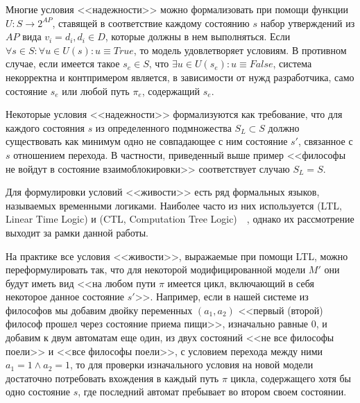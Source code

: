 Многие условия <<надежности>> можно формализовать при помощи функции $U\colon S
\rightarrow 2^{AP}$, ставящей в соответствие каждому состоянию $s$ набор утверждений из
$AP$ вида $v_i = d_i, d_i \in D$, которые должны в нем выполняться. Если $\forall s \in
S:\forall u \in U(s):u \equiv True$, то модель удовлетворяет условиям. В противном случае,
если имеется такое $s_e \in S$, что $\exists u \in U(s_e)\colon u \equiv False$, система
некорректна и контпримером является, в зависимости от нужд разработчика, само состояние
$s_e$ или любой путь $\pi_e$, содержащий $s_e$.

Некоторые условия <<надежности>> формализуются как требование, что для каждого состояния
$s$ из определенного подмножества $S_L \subset S$ должно существовать как минимум одно не
совпадающее с ним состояние $s'$, связанное с $s$ отношением перехода. В частности,
приведенный выше пример <<философы не войдут в состояние взаимоблокировки>> соответствует
случаю $S_L = S$.

Для формулировки условий <<живости>> есть ряд формальных языков, называемых временными
логиками. Наиболее часто из них используется  (LTL, Linear
Time Logic) и  (CTL, Computation Tree
Logic)~\cite{Clarke}~\cite{Velder}, однако их рассмотрение выходит за рамки данной
работы.

На практике все условия <<живости>>, выражаемые при помощи LTL, можно переформулировать
так, что для некоторой модифицированной модели $M'$ они будут иметь вид <<на любом пути
$\pi$ имеется цикл, включающий в себя некоторое данное состояние $s'$>>. Например, если в
нашей системе из философов мы добавим двойку переменных $(a_1, a_2)$ <<первый (второй)
философ прошел через состояние приема пищи>>, изначально равные $0$, и добавим к двум
автоматам еще один, из двух состояний <<не все философы поели>> и <<все философы поели>>,
с условием перехода между ними $a_1 = 1 \wedge a_2 = 1$, то для проверки изначального
условия на новой модели достаточно потребовать вхождения в каждый путь $\pi$ цикла,
содержащего хотя бы одно состояние $s$, где последний автомат пребывает во втором своем
состоянии.

